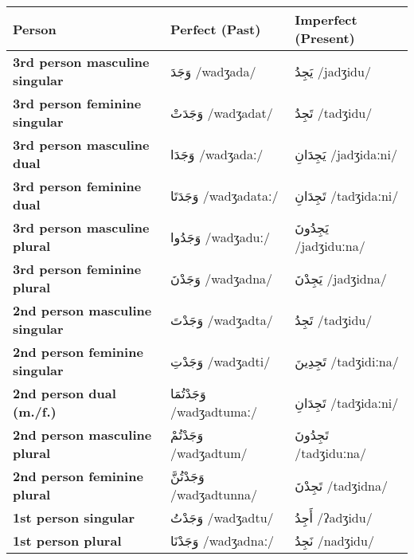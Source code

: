 \documentclass[letterpaper,12pt]{article}
\begin{document}
\begin{longtable}{|>{\raggedright}p{3.5cm}|p{5cm}|p{5cm}|}
\hline
\textbf{Person} & \textbf{Perfect (Past)} & \textbf{Imperfect (Present)} \\
\hline
\textbf{3rd person masculine singular} & \textarabic{وَجَدَ} /wadʒada/ & \textarabic{يَجِدُ} /jadʒidu/ \\
\hline
\textbf{3rd person feminine singular} & \textarabic{وَجَدَتْ} /wadʒadat/ & \textarabic{تَجِدُ} /tadʒidu/ \\
\hline
\textbf{3rd person masculine dual} & \textarabic{وَجَدَا} /wadʒadaː/ & \textarabic{يَجِدَانِ} /jadʒidaːni/ \\
\hline
\textbf{3rd person feminine dual} & \textarabic{وَجَدَتَا} /wadʒadataː/ & \textarabic{تَجِدَانِ} /tadʒidaːni/ \\
\hline
\textbf{3rd person masculine plural} & \textarabic{وَجَدُوا} /wadʒaduː/ & \textarabic{يَجِدُونَ} /jadʒiduːna/ \\
\hline
\textbf{3rd person feminine plural} & \textarabic{وَجَدْنَ} /wadʒadna/ & \textarabic{يَجِدْنَ} /jadʒidna/ \\
\hline
\textbf{2nd person masculine singular} & \textarabic{وَجَدْتَ} /wadʒadta/ & \textarabic{تَجِدُ} /tadʒidu/ \\
\hline
\textbf{2nd person feminine singular} & \textarabic{وَجَدْتِ} /wadʒadti/ & \textarabic{تَجِدِينَ} /tadʒidiːna/ \\
\hline
\textbf{2nd person dual (m./f.)} & \textarabic{وَجَدْتُمَا} /wadʒadtumaː/ & \textarabic{تَجِدَانِ} /tadʒidaːni/ \\
\hline
\textbf{2nd person masculine plural} & \textarabic{وَجَدْتُمْ} /wadʒadtum/ & \textarabic{تَجِدُونَ} /tadʒiduːna/ \\
\hline
\textbf{2nd person feminine plural} & \textarabic{وَجَدْتُنَّ} /wadʒadtunna/ & \textarabic{تَجِدْنَ} /tadʒidna/ \\
\hline
\textbf{1st person singular} & \textarabic{وَجَدْتُ} /wadʒadtu/ & \textarabic{أَجِدُ} /ʔadʒidu/ \\
\hline
\textbf{1st person plural} & \textarabic{وَجَدْنَا} /wadʒadnaː/ & \textarabic{نَجِدُ} /nadʒidu/ \\
\hline
\end{longtable}
\end{document}
